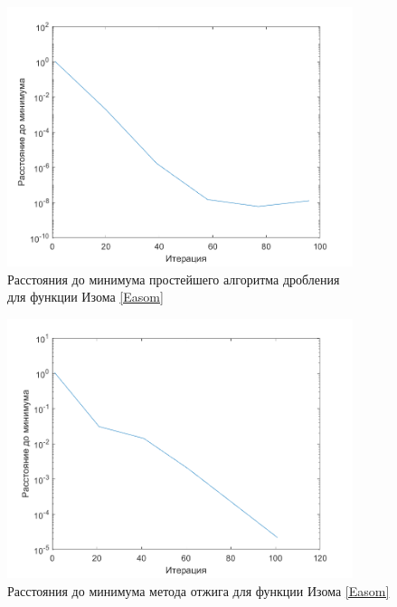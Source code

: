\begin{figure}[H]
\centering
\includegraphics[width=0.9\textwidth]{Graphics/TrivialDivide_Easom_dist_to_min.png}
\caption{Расстояния до минимума простейшего алгоритма дробления\\ для функции Изома \eqref{Easom}} 
\end{figure}
\begin{figure}[H]
\centering
\includegraphics[width=0.9\textwidth]{Graphics/SimAnnealing_Easom_dist_to_min.png}
\caption{Расстояния до минимума метода отжига для функции Изома \eqref{Easom}} 
\end{figure}

